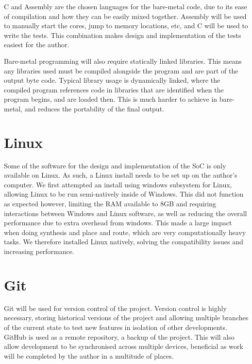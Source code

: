 C and Assembly are the chosen languages for the bare-metal code, due to its ease of compilation and how they can be easily mixed together. Assembly will be used to manually start the cores, jump to memory locations, etc, and C will be used to write the tests. This combination makes design and implementation of the tests easiest for the author.

Bare-metal programming will also require statically linked libraries. This means any libraries used must be compiled alongside the program and are part of the output byte code. Typical library usage is dynamically linked, where the compiled program references code in libraries that are identified when the program begins, and are loaded then. This is much harder to achieve in bare-metal, and reduces the portability of the final output.

\section{Linux}
Some of the software for the design and implementation of the SoC is only available on Linux. As such, a Linux install needs to be set up on the author's computer. We first attempted an install using windows subsystem for Linux, allowing Linux to be run semi-natively inside of Windows. This did not function as expected however, limiting the RAM available to 8GB and requiring interactions between Windows and Linux software, as well as reducing the overall performance due to extra overhead from windows. This made a large impact when doing synthesis and place and route, which are very computationally heavy tasks. We therefore installed Linux natively, solving the compatibility issues and increasing performance.

\section{Git}
Git will be used for version control of the project. Version control is highly necessary, storing historical versions of the project and allowing multiple branches of the current state to test new features in isolation of other developments. GitHub is used as a remote repository, a backup of the project. This will also allow development to be synchronised across multiple devices, beneficial as work will be completed by the author in a multitude of places.